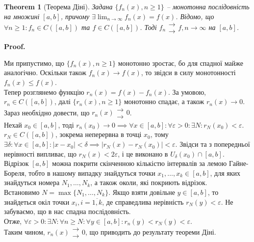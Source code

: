 \documentclass[a4paper, 10pt]{article}
\makeatletter
\def\huge{\displaystyle}
\theoremstyle{theoremdd}
\newtheorem{theorem}{Theorem}[subsection]
\theoremstyle{theoremdd}
\theoremstyle{theoremdd}
\theoremstyle{theoremdd}
\theoremstyle{theoremdd}
\newtheorem{example}[theorem]{Example}
\theoremstyle{theoremdd}
\theoremstyle{theoremdd}
\theoremstyle{theoremdd}
\theoremstyle{theoremdd}
\renewenvironment{proof}[1][Proof.\\]{\par
\pushQED{\hfill \qed}%
\normalfont \topsep6\p@\@plus6\p@\relax
\trivlist
\item\relax
{\bfseries
#1\@addpunct{.}}\hspace\labelsep\ignorespaces
}{%
\popQED\endtrivlist\@endpefalse
}
\makeatother
\begin{document}
\begin{theorem}[Теорема Діні]
Задана $\{ f_n(x), n \geq 1 \}$ -- монотонна послідовність на множині $[a,b]$, причому $\exists \huge\lim_{n \to \infty} f_n(x) = f(x)$. Відомо, що $\forall n \geq 1: f_n \in C([a,b])$ та $f \in C([a,b])$. Тоді $f_n \substack{\rightarrow \\ \rightarrow} f, n \to \infty$ на $[a,b]$.
\end{theorem}

\begin{proof}
Ми припустимо, що $\{ f_n(x), n \geq 1 \}$ монотонно зростає, бо для спадної майже аналогічно. Оскільки також $f_n(x) \to f(x)$, то звідси в силу монотонності $f_n(x) \leq f(x)$.\\
Тепер розглянемо функцію $r_n(x) = f(x) - f_n(x)$. За умовою, $r_n \in C([a,b])$, далі $\{r_n(x), n \geq 1\}$ монотонно спадає, а також $r_n(x) \to 0$. Зараз необхідно довести, що $r_n(x) \substack{\rightarrow \\ \rightarrow} 0$.\\
Нехай $x_0 \in [a,b]$, тоді $r_n(x_0) \to 0 \implies \forall x \in [a,b]: \forall \varepsilon > 0: \exists N: r_N(x_0) < \varepsilon$.
$r_N \in C([a,b])$, зокрема неперервна в точці $x_0$, тому $\exists \delta: \forall x \in [a,b]: |x-x_0| < \delta \implies |r_N(x) - r_N(x_0)| < \varepsilon$. Звідси та з попередньої нерівності випливає, що $r_N(x) < 2\varepsilon$, і це виконано в $U_{\delta} (x_0) \cap [a,b]$.\\
Відрізок $[a,b]$ можна покрити скінченною кількістю інтервалів за лемою Гайне-Бореля, тобто в нашому випадку знайдуться точки $x_1,\dots,x_k \in [a,b]$, для яких знайдуться номера $N_1,\dots,N_k$, а також околи, які покриють відрізок.\\
Встановимо $N = \max \{N_1,\dots,N_k\}$. Якщо взяти довільне $y \in [a,b]$, то знайдеться окіл точки $x_i, i = \overline{1,k}$, де справедлива нерівність $r_N(y) < \varepsilon$. Не забуваємо, що в нас спадна послідовність.\\
Отже, $\forall \varepsilon > 0: \exists N: \forall n \geq N: \forall y \in [a,b]: r_n(y) < r_N(y) < \varepsilon$.\\
Таким чином, $r_n(x) \substack{\rightarrow \\ \rightarrow} 0$, що приводить до результату теореми Діні.
\end{proof}

\end{document}
